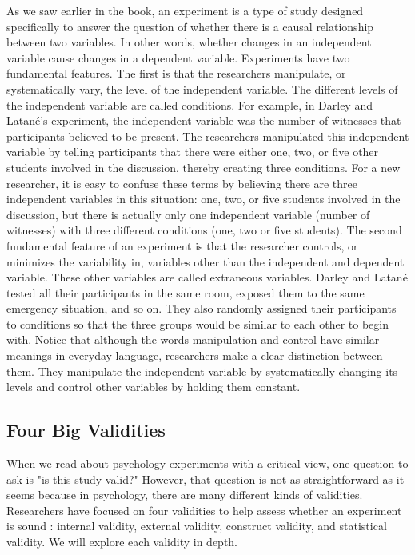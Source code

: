  As we saw earlier in the book, an experiment is a type of study designed specifically to answer the question of whether there is a causal relationship between two variables. In other words, whether changes in an independent variable cause changes in a dependent variable. Experiments have two fundamental features. The first is that the researchers manipulate, or systematically vary, the level of the independent variable. The different levels of the independent variable are called conditions. For example, in Darley and Latan\'e's experiment, the independent variable was the number of witnesses that participants believed to be present. The researchers manipulated this independent variable by telling participants that there were either one, two, or five other students involved in the discussion, thereby creating three conditions. For a new researcher, it is easy to confuse these terms by believing there are three independent variables in this situation: one, two, or five students involved in the discussion, but there is actually only one independent variable (number of witnesses) with three different conditions (one, two or five students). The second fundamental feature of an experiment is that the researcher controls, or minimizes the variability in, variables other than the independent and dependent variable. These other variables are called extraneous variables. Darley and Latan\'e tested all their participants in the same room, exposed them to the same emergency situation, and so on. They also randomly assigned their participants to conditions so that the three groups would be similar to each other to begin with. Notice that although the words manipulation and control have similar meanings in everyday language, researchers make a clear distinction between them. They manipulate the independent variable by systematically changing its levels and control other variables by holding them constant.

 \subsection{Four Big Validities}

 When we read about psychology experiments with a critical view, one question to ask is "is this study valid?" However, that question is not as straightforward as it seems because in psychology, there are many different kinds of validities. Researchers have focused on four validities to help assess whether an experiment is sound \citep{kenny_estimating_1981,morling_guide_2014}: internal validity, external validity, construct validity, and statistical validity. We will explore each validity in depth.

